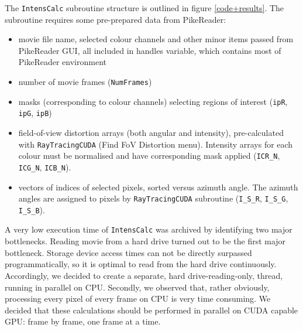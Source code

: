 \documentclass[preprint,review,12pt,dvips]{elsarticle}
\begin{document}
The \texttt{IntensCalc} subroutine structure is outlined in figure \ref{code+results}. The subroutine requires some
pre-prepared data from PikeReader:
\begin{itemize}
\item movie file name, selected colour channels and other minor items passed from PikeReader GUI, all included in handles
variable, which contains most of PikeReader environment

\item number of movie frames (\texttt{NumFrames})

\item masks (corresponding to colour channels) selecting regions of interest (\texttt{ipR}, \texttt{ipG}, \texttt{ipB})

\item field-of-view distortion arrays (both angular and intensity), pre-calculated with \texttt{RayTracingCUDA} (Find FoV
Distortion menu). Intensity arrays for each colour must be normalised and have corresponding mask applied (\verb"ICR_N",
\verb"ICG_N", \verb"ICB_N").

\item vectors of indices of selected pixels, sorted versus azimuth angle. The azimuth angles are assigned to pixels by
\texttt{RayTracingCUDA} subroutine (\verb"I_S_R", \verb"I_S_G", \verb"I_S_B").
\end{itemize}

A very low execution time of \texttt{IntensCalc} was archived by identifying two major bottlenecks. Reading movie from a
hard drive turned out to be the first major bottleneck. Storage device access times can not be directly surpassed
programmatically, so it is optimal to read from the hard drive continuously. Accordingly, we decided to create a separate,
hard drive-reading-only, thread, running in parallel on CPU. Secondly, we observed that, rather obviously, processing
every pixel of every frame on CPU is very time consuming. We decided that these calculations should be performed in
parallel on CUDA capable GPU: frame by frame, one frame at a time.
\end{document}
